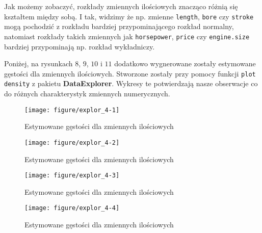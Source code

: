 \documentclass[12pt, a4paper]{article}\usepackage[]{graphicx}\usepackage[]{xcolor}
\makeatletter
\def\maxwidth{ %
  \ifdim\Gin@nat@width>\linewidth
    \linewidth
  \else
    \Gin@nat@width
  \fi
}
\newenvironment{knitrout}{}{} %
\makeatother
\begin{document}
Jak możemy zobaczyć, rozkłady zmiennych ilościowych znacząco różnią się kształtem między sobą. I tak, widzimy że np. zmienne \texttt{length}, \texttt{bore} czy \texttt{stroke} mogą pochodzić z rozkładu bardziej przypominającego rozkład normalny, natomiast rozkłady takich zmiennych jak \texttt{horsepower}, \texttt{price} czy \texttt{engine.size} bardziej przypominają np. rozkład wykładniczy. 
\par
Poniżej, na rysunkach $8$, $9$, $10$ i $11$ dodatkowo wygnerowane zostały estymowane gęstości dla zmiennych ilościowych. Stworzone zostały przy pomocy funkcji \texttt{plot density} z pakietu \textbf{DataExplorer}. Wykresy te potwierdzają nasze obserwacje co do różnych charakterystyk zmiennych numerycznych.
\begin{knitrout}
\color{fgcolor}\begin{figure}[H]

{\centering \texttt{[image: figure/explor\_4-1]} 

}

\caption[Estymowane gęstości dla zmiennych ilościowych]{Estymowane gęstości dla zmiennych ilościowych}\label{fig:explor_4-1}
\end{figure}

\begin{figure}[H]

{\centering \texttt{[image: figure/explor\_4-2]} 

}

\caption[Estymowane gęstości dla zmiennych ilościowych]{Estymowane gęstości dla zmiennych ilościowych}\label{fig:explor_4-2}
\end{figure}

\begin{figure}[H]

{\centering \texttt{[image: figure/explor\_4-3]} 

}

\caption[Estymowane gęstości dla zmiennych ilościowych]{Estymowane gęstości dla zmiennych ilościowych}\label{fig:explor_4-3}
\end{figure}

\begin{figure}[H]

{\centering \texttt{[image: figure/explor\_4-4]} 

}

\caption[Estymowane gęstości dla zmiennych ilościowych]{Estymowane gęstości dla zmiennych ilościowych}\label{fig:explor_4-4}
\end{figure}

\end{knitrout}
\end{document}
